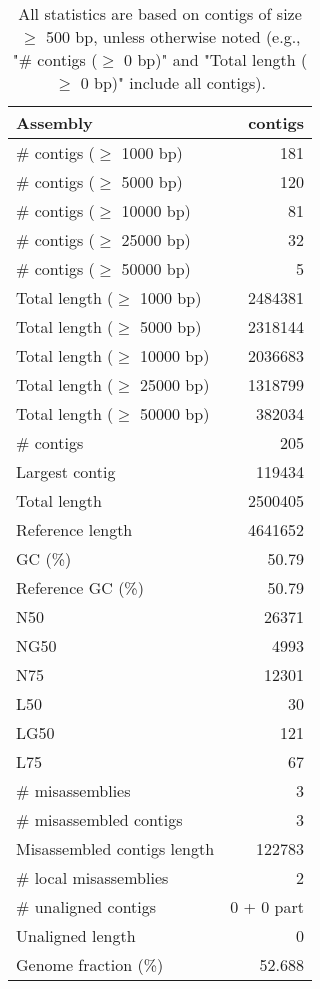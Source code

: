 \documentclass[12pt,a4paper]{article}
\begin{document}
\begin{table}[ht]
\begin{center}
\caption{All statistics are based on contigs of size $\geq$ 500 bp, unless otherwise noted (e.g., "\# contigs ($\geq$ 0 bp)" and "Total length ($\geq$ 0 bp)" include all contigs).}
\begin{tabular}{|l*{1}{|r}|}
\hline
Assembly & contigs \\ \hline
\# contigs ($\geq$ 1000 bp) & 181 \\ \hline
\# contigs ($\geq$ 5000 bp) & 120 \\ \hline
\# contigs ($\geq$ 10000 bp) & 81 \\ \hline
\# contigs ($\geq$ 25000 bp) & 32 \\ \hline
\# contigs ($\geq$ 50000 bp) & 5 \\ \hline
Total length ($\geq$ 1000 bp) & 2484381 \\ \hline
Total length ($\geq$ 5000 bp) & 2318144 \\ \hline
Total length ($\geq$ 10000 bp) & 2036683 \\ \hline
Total length ($\geq$ 25000 bp) & 1318799 \\ \hline
Total length ($\geq$ 50000 bp) & 382034 \\ \hline
\# contigs & 205 \\ \hline
Largest contig & 119434 \\ \hline
Total length & 2500405 \\ \hline
Reference length & 4641652 \\ \hline
GC (\%) & 50.79 \\ \hline
Reference GC (\%) & 50.79 \\ \hline
N50 & 26371 \\ \hline
NG50 & 4993 \\ \hline
N75 & 12301 \\ \hline
L50 & 30 \\ \hline
LG50 & 121 \\ \hline
L75 & 67 \\ \hline
\# misassemblies & 3 \\ \hline
\# misassembled contigs & 3 \\ \hline
Misassembled contigs length & 122783 \\ \hline
\# local misassemblies & 2 \\ \hline
\# unaligned contigs & 0 + 0 part \\ \hline
Unaligned length & 0 \\ \hline
Genome fraction (\%) & 52.688 \\ \hline

\end{tabular}
\end{center}
\end{table}
\end{document}
